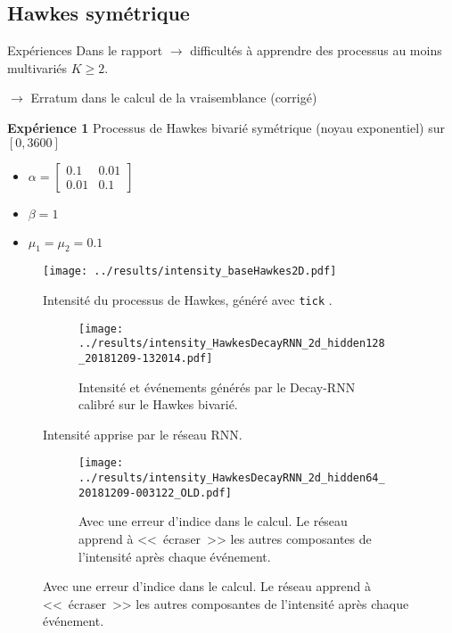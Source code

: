 \documentclass[../main.tex]{subfiles}
\begin{document}
\subsection{Hawkes symétrique}

\begin{frame}{Expériences}
Dans le rapport $\rightarrow$ difficultés à apprendre des processus au moins multivariés $K\geq 2$.\pause

$\rightarrow$ Erratum dans le calcul de la vraisemblance (corrigé)

\textbf{Expérience 1} Processus de Hawkes bivarié symétrique (noyau exponentiel) sur $[0, 3600]$
\begin{itemize}
	\item $\alpha = \begin{bmatrix}0.1 & 0.01 \\ 0.01 & 0.1\end{bmatrix}$
	\item $\beta = 1$
	\item $\mu_1 = \mu_2 = \num{0.1}$
\end{itemize}
\end{frame}

\begin{frame}

\begin{figure}
	\texttt{[image: ../results/intensity\_baseHawkes2D.pdf]}
	\caption{Intensité du processus de Hawkes, généré avec \texttt{tick} \autocite{2017arXiv170703003B}.}
\end{figure}
\end{frame}

\begin{frame}
\begin{figure}
\begin{subfigure}{\linewidth}
	\texttt{[image: ../results/intensity\_HawkesDecayRNN\_2d\_hidden128\_20181209-132014.pdf]}
	\caption{Intensité et événements générés par le Decay-RNN calibré sur le Hawkes bivarié.}
\end{subfigure}
	\caption{Intensité apprise par le réseau RNN.}
\end{figure}
\end{frame}

\begin{frame}
\begin{figure}\ContinuedFloat
\begin{subfigure}{\linewidth}
	\texttt{[image: ../results/intensity\_HawkesDecayRNN\_2d\_hidden64\_20181209-003122\_OLD.pdf]}
	\caption{Avec une erreur d'indice dans le calcul. Le réseau apprend à <<~écraser~>> les autres composantes de l'intensité après chaque événement.}
\end{subfigure}
\end{figure}
\end{frame}
\end{document}
